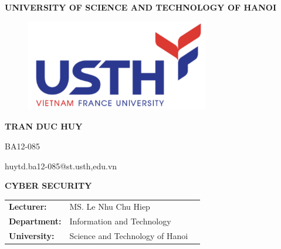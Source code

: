 \documentclass{article}
\begin{document}
\begin{center}
    \vspace{12pt} %
        \textbf{\fontsize{15pt}{0pt} \selectfont{} UNIVERSITY OF SCIENCE AND TECHNOLOGY OF HANOI}
    \vspace{0.5cm}

\begin{figure}[H]
    \centering
    \includegraphics[width=8cm, height=4cm]{Logo/usth.png}
\end{figure}

\vspace{48pt}
\vspace{24pt}

\vspace{18pt}

        \fontsize{14pt}{0pt}\selectfont{} \textbf{TRAN DUC HUY}
    \vspace{3pt}

        \fontsize{14pt}{0pt}\selectfont{} BA12-085
    \vspace{3pt}

        \fontsize{14pt}{0pt}\selectfont{} huytd.ba12-085@st.usth,edu.vn
    \vspace{12pt} %

        \fontsize{14pt}{0pt}\selectfont{} \textbf{CYBER SECURITY} 

\end{center}
    \vspace{48pt}

\begin{table}[H]
    \centering
        \begin{tabular}{l l c}
            \textbf{Lecturer:}    &  MS. Le Nhu Chu Hiep \vspace{6pt} &  \\
            \textbf{Department:} & Information and Technology \vspace{3pt}\\ 
            \textbf{University:} & Science and Technology of Hanoi
        \end{tabular}
\end{table}
\end{document}
